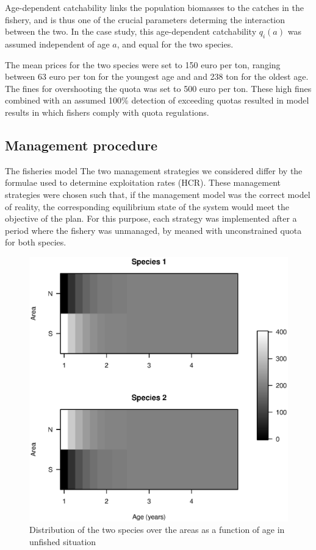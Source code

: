 \documentclass[12pt,oneline,a4paper,numbib]{ouparticle}
\numberwithin{equation}{subsection} %
\begin{document}
Age-dependent catchability links the population biomasses to the catches in the fishery, and is thus one of the crucial parameters determing the interaction between the two. In the case study, this age-dependent catchability $q_i (a)$ was assumed independent of age $a$, and equal for the two species.

The mean prices for the two species were set to 150 euro per ton, ranging between 63 euro per ton for the youngest age and and 238 ton for the oldest age. The fines for overshooting the quota was set  to 500 euro per ton. These high fines combined with an assumed 100\% detection of exceeding quotas resulted in model results in which fishers comply with quota regulations.

\subsection{Management procedure}
\label{sec2.3}
The fisheries model 
The two management strategies we considered differ by the formulae used to determine exploitation rates (HCR). These management strategies were chosen such that, if  the  management  model  was  the  correct  model  of  reality,  the corresponding  equilibrium  state  of  the  system  would  meet  the  objective  of  the  plan. For this purpose, each strategy was implemented after a period where the fishery was unmanaged, by meaned with unconstrained quota for both species.

\begin{figure}[!ht]
\centering
\label{f:distributions}
\includegraphics[width=.69\textwidth]{Figures/distributions.eps} 
\caption{Distribution of the two species over the areas as a function of age in unfished situation}
\end{figure}
\end{document}
